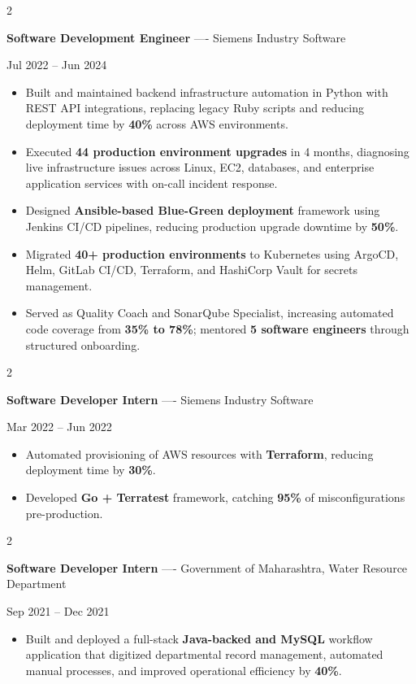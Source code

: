 \documentclass[10pt, letterpaper]{article}
\newenvironment{highlights}{
    \begin{itemize}[
        topsep=0.10 cm,
        parsep=0.06 cm,
        partopsep=0pt,
        itemsep=0.06 cm,
        leftmargin=12pt
    ]
}{
    \end{itemize}
}
\newenvironment{twocolentry}[2][]{
    \onecolentry
    \def\secondColumn{#2}
    \setcolumnwidth{\fill, 4.5 cm}
    \begin{paracol}{2}
}{
    \switchcolumn \raggedleft \secondColumn
    \end{paracol}
    \endonecolentry
}
\begin{document}
\vspace{0.15 cm}

\begin{twocolentry}{Jul 2022 -- Jun 2024}
\textbf{Software Development Engineer} ---- Siemens Industry Software
\end{twocolentry}
\begin{highlights}
  \item Built and maintained backend infrastructure automation in Python with REST API integrations, replacing legacy Ruby scripts and reducing deployment time by \textbf{40\%} across AWS environments.
  \item Executed \textbf{44 production environment upgrades} in 4 months, diagnosing live infrastructure issues across Linux, EC2, databases, and enterprise application services with on-call incident response.
  \item Designed \textbf{Ansible-based Blue-Green deployment} framework using Jenkins CI/CD pipelines, reducing production upgrade downtime by \textbf{50\%}.
  \item Migrated \textbf{40+ production environments} to Kubernetes using ArgoCD, Helm, GitLab CI/CD, Terraform, and HashiCorp Vault for secrets management.
  \item Served as Quality Coach and SonarQube Specialist, increasing automated code coverage from \textbf{35\% to 78\%}; mentored \textbf{5 software engineers} through structured onboarding.
\end{highlights}

\vspace{0.15 cm}

\begin{twocolentry}{Mar 2022 -- Jun 2022}
\textbf{Software Developer Intern} ---- Siemens Industry Software
\end{twocolentry}
\begin{highlights}
  \item Automated provisioning of AWS resources with \textbf{Terraform}, reducing deployment time by \textbf{30\%}.
  \item Developed \textbf{Go + Terratest} framework, catching \textbf{95\%} of misconfigurations pre-production.
\end{highlights}

\vspace{0.15 cm}

\begin{twocolentry}{Sep 2021 -- Dec 2021}
\textbf{Software Developer Intern} ---- Government of Maharashtra, Water Resource Department
\end{twocolentry}
\begin{highlights}
  \item Built and deployed a full-stack \textbf{Java-backed and MySQL} workflow application that digitized departmental record management, automated manual processes, and improved operational efficiency by \textbf{40\%}.
\end{highlights}
\end{document}
